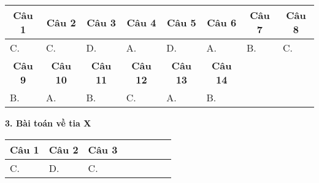 \begin{longtable}[\textwidth]{|p{}|p{}|p{}|p{}|p{}|p{}|p{}|p{}|}
	\hline%
	\multicolumn{1}{|c}{\textbf{Câu 1}} & \multicolumn{1}{|c|}{\textbf{Câu 2}} & \multicolumn{1}{c|}{\textbf{Câu 3}} &
	\multicolumn{1}{c|}{\textbf{Câu 4}} &
	\multicolumn{1}{c|}{\textbf{Câu 5}} &
	\multicolumn{1}{c|}{\textbf{Câu 6}} &
	\multicolumn{1}{c|}{\textbf{Câu 7}} &
	\multicolumn{1}{c|}{\textbf{Câu 8}}\\
	\hline
	C. &C. &D. &A. &D. &A. &B. &C.\\
	\hline
	
	\multicolumn{1}{|c|}{\textbf{Câu 9}} & \multicolumn{1}{c|}{\textbf{Câu 10}} & \multicolumn{1}{c|}{\textbf{Câu 11}} &
	\multicolumn{1}{c|}{\textbf{Câu 12}} &
	\multicolumn{1}{c|}{\textbf{Câu 13}} &
	\multicolumn{1}{c|}{\textbf{Câu 14}} &
	\multicolumn{1}{c|}{\textbf{}} &
	\multicolumn{1}{c|}{} \\
	\hline
	B. &A. &B. &C. &A. &B. & &\\
	\hline		
\end{longtable}


\textbf{3. Bài toán về tia X}
\begin{longtable}[\textwidth]{|p{}|p{}|p{}|p{}|p{}|p{}|p{}|p{}|}
	\hline%
	\multicolumn{1}{|c}{\textbf{Câu 1}} & \multicolumn{1}{|c|}{\textbf{Câu 2}} & \multicolumn{1}{c|}{\textbf{Câu 3}} &
	\multicolumn{1}{c|}{\textbf{}} &
	\multicolumn{1}{c|}{\textbf{}} &
	\multicolumn{1}{c|}{\textbf{}} &
	\multicolumn{1}{c|}{\textbf{}} &
	\multicolumn{1}{c|}{\textbf{}}\\
	\hline
	C. &D. &C. & & & & & \\
	\hline
\end{longtable}	




